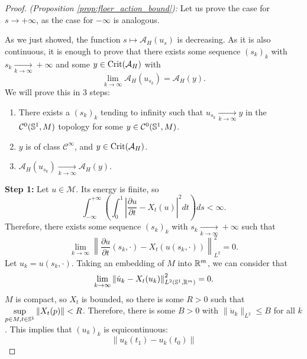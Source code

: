 \begin{proof} {\it (Proposition \ref{prop:floer_action_bound}):} Let us prove the case for $s \rightarrow +\infty$, as the case for $-\infty$ is analogous.

As we just showed, the function $s \mapsto \mathcal{A}_H(u_s)$ is decreasing. As it is also continuous, it is enough to prove that there exists some sequence $(s_k)_k$ with $s_k \xrightarrow[k \rightarrow \infty]{} +\infty$ and some $y \in \text{Crit}(\mathcal{A}_H)$ with
\[\lim_{k \rightarrow \infty} \mathcal{A}_H(u_{s_k}) = \mathcal{A}_H(y) .\]
We will prove this in 3 steps:
\begin{enumerate}
	\item There exists a $(s_k)_k$ tending to infinity such that $u_{s_k} \xrightarrow[k\rightarrow \infty]{} y$ in the $\mathcal{C}^0(\mathbb{S}^1,M)$ topology for some $y \in \mathcal{C}^0(\mathbb{S}^1,M)$.
	\item $y$ is of class $\mathcal{C}^{\infty}$, and $y \in \text{Crit}(\mathcal{A}_H)$.
	\item $\mathcal{A}_H(u_{s_k}) \xrightarrow[k \rightarrow \infty]{} \mathcal{A}_H(y)$.
\end{enumerate}

{\bf Step 1:} Let $u \in \mathcal{M}$. Its energy is finite, so
\[\int_{-\infty}^{+\infty} \left( \int_0^1 \left| \frac{\partial u}{\partial t} - X_t(u) \right|^2 dt \right) ds < \infty .\]
Therefore, there exists some sequence $(s_k)_k$ with $s_k \xrightarrow[k\rightarrow \infty]{} +\infty$ such that
\[\lim_{k\rightarrow \infty} \left\| \frac{\partial u}{\partial t}(s_k,\cdot) - X_t(u(s_k,\cdot)) \right\|_{L^2}^2 = 0 .\]
Let $u_k = u(s_k,\cdot)$. Taking an embedding of $M$ into $\mathbb{R}^m$, we can consider that
\[\lim_{k\rightarrow \infty} \left\| \dot{u}_k - X_t(u_k) \right\|_{L^2(\mathbb{S}^1,\mathbb{R}^m)}^2 = 0 .\]
$M$ is compact, so $X_t$ is bounded, so there is some $R > 0$ such that $\displaystyle\sup_{p \in M, t \in \mathbb{S}^1} \|X_t(p)\| < R$. Therefore, there is some $B > 0$ with $\|\dot{u}_k\|_{L^2} \leq B$ for all $k$. This implies that $(u_k)_k$ is equicontinuous:
\[\|u_k(t_1) - u_k(t_0)\|\]
\end{proof}
